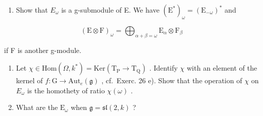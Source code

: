 \begin{enumerate}
\def\labelenumi{\alph{enumi})}
\tightlist
\item
  Show that \(E_{\omega}\) is a g-submodule of E. We have \((\mathrm{E}^{*})_{\omega} = (\mathrm{E}_{-\omega})^{*}\) and
\end{enumerate}

\[
(\mathrm{E} \otimes \mathrm{F}) _ {\omega} = \bigoplus_ {\alpha + \beta = \omega} \mathrm{E} _ {\alpha} \otimes \mathrm{F} _ {\beta}
\]

if F is another g-module.

\begin{enumerate}
\def\labelenumi{\alph{enumi})}
\setcounter{enumi}{1}
\item
  Let \(\chi\in\mathrm{Hom}(\varOmega,k^{*})=\mathrm{Ker}(\mathrm{T}_{\mathrm{P}}\to\mathrm{T}_{\mathrm{Q}})\) . Identify \(\chi\) with an element of the kernel of \(f:\mathrm{G}\to\mathrm{Aut}_{e}(\mathfrak{g})\) , cf.~Exerc. 26 e). Show that the operation of \(\chi\) on \(E_{\omega}\) is the homothety of ratio \(\chi(\omega)\) .
\item
  What are the \(\mathrm{E}_{\omega}\) when \(\mathfrak{g} = \mathfrak{sl}(2,k)\) ?
\end{enumerate}

